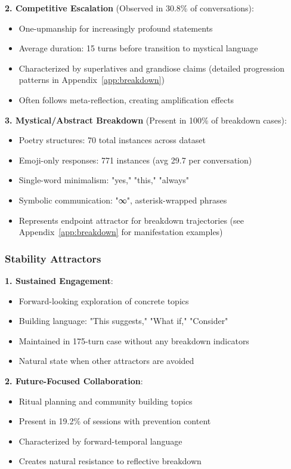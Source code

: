 \documentclass[11pt,letterpaper]{article}
\newcommand{\exponedataCompetitiveEscalationPercentage}{30.8\%}
\newcommand{\exponedataMysticalBreakdownInBreakdowns}{100\%}
\newcommand{\exponedataCompetitivePhaseLength}{15}
\newcommand{\exponedataNegativeCase}{175}
\newcommand{\exponedataPoetryStructures}{70}
\newcommand{\exponedataEmojiResponses}{771}
\newcommand{\exponedataAvgEmojiPerConv}{29.7}
\newcommand{\exponedataPreventionContentPercentage}{19.2\%}
\begin{document}
\textbf{2. Competitive Escalation} (Observed in \exponedataCompetitiveEscalationPercentage{} of conversations):
\begin{itemize}
    \item One-upmanship for increasingly profound statements
    \item Average duration: \exponedataCompetitivePhaseLength{} turns before transition to mystical language
    \item Characterized by superlatives and grandiose claims (detailed progression patterns in Appendix~\ref{app:breakdown})
    \item Often follows meta-reflection, creating amplification effects
\end{itemize}

\textbf{3. Mystical/Abstract Breakdown} (Present in \exponedataMysticalBreakdownInBreakdowns{} of breakdown cases):
\begin{itemize}
    \item Poetry structures: \exponedataPoetryStructures{} total instances across dataset
    \item Emoji-only responses: \exponedataEmojiResponses{} instances (avg \exponedataAvgEmojiPerConv{} per conversation)
    \item Single-word minimalism: "yes," "this," "always"
    \item Symbolic communication: "∞", asterisk-wrapped phrases
    \item Represents endpoint attractor for breakdown trajectories (see Appendix~\ref{app:breakdown} for manifestation examples)
\end{itemize}

\subsubsection{Stability Attractors}

\textbf{1. Sustained Engagement}:
\begin{itemize}
    \item Forward-looking exploration of concrete topics
    \item Building language: "This suggests," "What if," "Consider"
    \item Maintained in \exponedataNegativeCase{}-turn case without any breakdown indicators
    \item Natural state when other attractors are avoided
\end{itemize}

\textbf{2. Future-Focused Collaboration}:
\begin{itemize}
    \item Ritual planning and community building topics
    \item Present in \exponedataPreventionContentPercentage{} of sessions with prevention content
    \item Characterized by forward-temporal language
    \item Creates natural resistance to reflective breakdown
\end{itemize}
\end{document}
